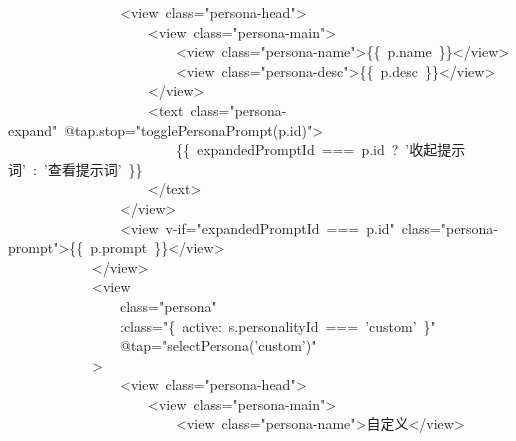 \documentclass[a4paper,10pt]{article}
\begin{document}
{~~~~~~~~~~~~~~~~<view~class="persona-head">\\
~~~~~~~~~~~~~~~~~~~~<view~class="persona-main">\\
~~~~~~~~~~~~~~~~~~~~~~~~<view~class="persona-name">\{\{~p.name~\}\}</view>\\
~~~~~~~~~~~~~~~~~~~~~~~~<view~class="persona-desc">\{\{~p.desc~\}\}</view>\\
~~~~~~~~~~~~~~~~~~~~</view>\\
~~~~~~~~~~~~~~~~~~~~<text~class="persona-expand"~@tap.stop="togglePersonaPrompt(p.id)">\\
~~~~~~~~~~~~~~~~~~~~~~~~\{\{~expandedPromptId~===~p.id~?~'收起提示词'~:~'查看提示词'~\}\}\\
~~~~~~~~~~~~~~~~~~~~</text>\\
~~~~~~~~~~~~~~~~</view>\\
~~~~~~~~~~~~~~~~<view~v-if="expandedPromptId~===~p.id"~class="persona-prompt">\{\{~p.prompt~\}\}</view>\\
~~~~~~~~~~~~</view>\\
~~~~~~~~~~~~<view\\
~~~~~~~~~~~~~~~~class="persona"\\
~~~~~~~~~~~~~~~~:class="\{~active:~s.personalityId~===~'custom'~\}"\\
~~~~~~~~~~~~~~~~@tap="selectPersona('custom')"\\
~~~~~~~~~~~~>\\
~~~~~~~~~~~~~~~~<view~class="persona-head">\\
~~~~~~~~~~~~~~~~~~~~<view~class="persona-main">\\
~~~~~~~~~~~~~~~~~~~~~~~~<view~class="persona-name">自定义</view>
}

\newpage
\end{document}

